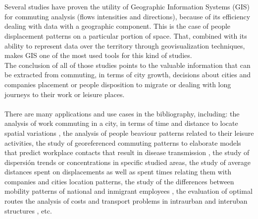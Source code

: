 \\
\\
Several studies have proven the utility of Geographic Information Systems (GIS) for commuting analysis (flows intensities and directions), because of its efficiency dealing with data with a geographic component. This is the case of people displacement patterns on a particular portion of space. That, combined with its ability to represent data over the territory through geovisualization techniques, makes GIS one of the most used tools for this kind of studies. 
\\
The conclusion of all of those studies points to the valuable information that can be extracted from commuting, in terms of city growth, decisions about cities and companies placement or people disposition to migrate or dealing with long journeys to their work or leisure places.
\\
\\
There are many applications and use cases in the bibliography, including: the analysis of work commuting in a city, in terms of time and distance to locate spatial variations \citep{wang2000modeling}, the analysis of people beaviour patterns related to their leisure activities, the study of georeferenced commuting patterns to elaborate models that predict workplace contacts that result in disease transmission \citep{chrest2009using}, the study of dispersión trends or concentrations in specific studied areas, the study of average distances spent on displacements as well as spent times relating them with companies and cities location patterns, the study of the differences between mobility patterns of national and inmigrant employees \citep{llano2006localizacion}, the evaluation of optimal routes \citep{theriault1999modelling} the analysis of costs and transport problems in intraurban and interuban structures \citep{zhan2008gis}, etc.
